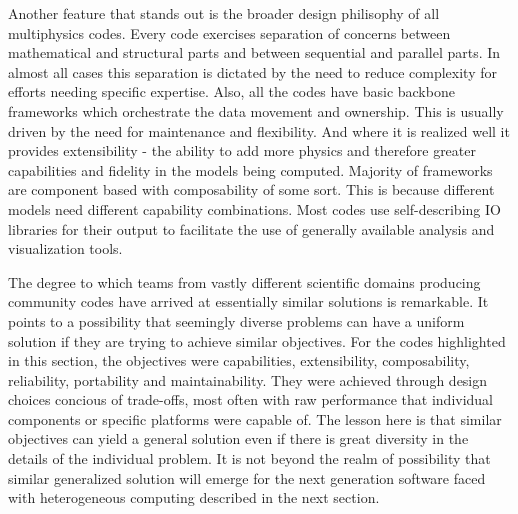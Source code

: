 Another feature that stands out is the broader design philisophy of
all multiphysics codes. Every code exercises separation of concerns
between mathematical and structural parts and between sequential and
parallel parts. In almost all cases this separation is dictated by the
need to reduce complexity for efforts needing specific
expertise. Also, all the codes have basic backbone frameworks which
orchestrate the data movement and ownership. This is
usually driven by the need for maintenance and flexibility. And where
it is realized well it provides extensibility - the ability to add
more physics and therefore greater capabilities and fidelity in the
models being computed. Majority of frameworks are component based with
composability of some sort. This is because different models need
different capability combinations. Most codes use self-describing IO
libraries for their output to facilitate the use of generally
available analysis and visualization tools. 

The degree to which teams from vastly different scientific domains
producing community codes have arrived at essentially similar
solutions is remarkable. It points to a possibility that seemingly
diverse problems can have a uniform solution if they are trying to
achieve similar objectives. For the codes highlighted in this section,
the objectives were capabilities, extensibility, composability,
reliability, portability and maintainability. They were achieved
through design choices concious of trade-offs, most often with raw
performance that individual components or specific platforms were
capable of. The lesson here is that similar objectives can yield a
general solution even if there is great diversity in the details of
the individual problem. It is not beyond the realm of possibility that
similar generalized solution will emerge for the next generation
software faced with heterogeneous computing described in the next
section.
